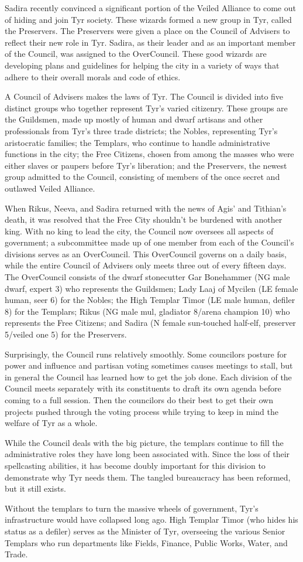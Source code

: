 {	Sadira recently convinced a significant portion of the Veiled Alliance to come out of hiding and join Tyr society. These wizards formed a new group in Tyr, called the Preservers. The Preservers were given a place on the Council of Advisers to reflect their new role in Tyr. Sadira, as their leader and as an important member of the Council, was assigned to the OverCouncil. These good wizards are developing plans and guidelines for helping the city in a variety of ways that adhere to their overall morals and code of ethics.
}
{
	A Council of Advisers makes the laws of Tyr. The Council is divided into five distinct groups who together represent Tyr's varied citizenry. These groups are the Guildsmen, made up mostly of human and dwarf artisans and other professionals from Tyr's three trade districts; the Nobles, representing Tyr's aristocratic families; the Templars, who continue to handle administrative functions in the city; the Free Citizens, chosen from among the masses who were either slaves or paupers before Tyr's liberation; and the Preservers, the newest group admitted to the Council, consisting of members of the once secret and outlawed Veiled Alliance.

	When Rikus, Neeva, and Sadira returned with the news of Agis' and Tithian's death, it was resolved that the Free City shouldn't be burdened with another king. With no king to lead the city, the Council now oversees all aspects of government; a subcommittee made up of one member from each of the Council's divisions serves as an OverCouncil. This OverCouncil governs on a daily basis, while the entire Council of Advisers only meets three out of every fifteen days. The OverCouncil consists of the dwarf stonecutter Gar Bonehammer (NG male dwarf, expert 3) who represents the Guildsmen; Lady Laaj of Mycilen (LE female human, seer 6) for the Nobles; the High Templar Timor (LE male human, defiler 8) for the Templars; Rikus (NG male mul, gladiator 8/arena champion 10) who represents the Free Citizens; and Sadira (N female sun-touched half-elf, preserver 5/veiled one 5) for the Preservers.

	Surprisingly, the Council runs relatively smoothly. Some councilors posture for power and influence and partisan voting sometimes causes meetings to stall, but in general the Council has learned how to get the job done. Each division of the Council meets separately with its constituents to draft its own agenda before coming to a full session. Then the councilors do their best to get their own projects pushed through the voting process while trying to keep in mind the welfare of Tyr as a whole.

	While the Council deals with the big picture, the templars continue to fill the administrative roles they have long been associated with. Since the loss of their spellcasting abilities, it has become doubly important for this division to demonstrate why Tyr needs them. The tangled bureaucracy has been reformed, but it still exists.

	Without the templars to turn the massive wheels of government, Tyr's infrastructure would have collapsed long ago. High Templar Timor (who hides his status as a defiler) serves as the Minister of Tyr, overseeing the various Senior Templars who run departments like Fields, Finance, Public Works, Water, and Trade.
}
